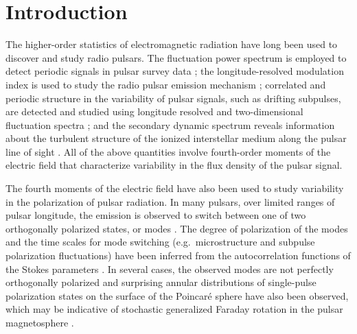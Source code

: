 \documentclass[twocolumn]{aastex6}
\begin{document}



\section {Introduction}

The higher-order statistics of electromagnetic radiation have long
been used to discover and study radio pulsars.
%
The fluctuation power spectrum is employed to detect periodic
signals in pulsar survey data \citep[e.g.][]{bc69,rem02};
%
the longitude-resolved modulation index is used to study the
radio pulsar emission mechanism
\citep[e.g.][]{tmh75,kd83,jg03,wse07};
%
correlated and periodic structure in the variability of pulsar
signals, such as drifting subpulses, are detected and studied using
longitude resolved and two-dimensional fluctuation spectra
\cite[e.g.][]{bac70,es02};
%
and the secondary dynamic spectrum reveals information about the
turbulent structure of the ionized interstellar medium along the
pulsar line of sight \cite[e.g.][]{smc+01,wmsz04,crsc06}.
%
All of the above quantities involve fourth-order moments of the
electric field that characterize variability in the flux density of
the pulsar signal.

The fourth moments of the electric field have also been used to study
variability in the polarization of pulsar radiation.
%
%
In many pulsars, over limited ranges of pulsar longitude, the emission
is observed to switch between one of two orthogonally polarized
states, or modes \citep[e.g.][]{em69,thhm71,mth75,br80,scr+84}.
%
%
The degree of polarization of the modes and the time scales for mode
switching (e.g.\ microstructure and subpulse polarization
fluctuations) have been inferred from the autocorrelation functions of
the Stokes parameters \citep[e.g.][]{cor76,ch77,cbh+04}.
%
In several cases, the observed modes are not perfectly orthogonally
polarized \citep[e.g.][]{br80,scr+84,gss91,mck03a}
%
and surprising annular distributions of single-pulse polarization states
on the surface of the Poincar\'{e} sphere have also been observed,
which may be indicative of stochastic generalized Faraday rotation in
the pulsar magnetosphere \citep{es04}.
\end{document}
